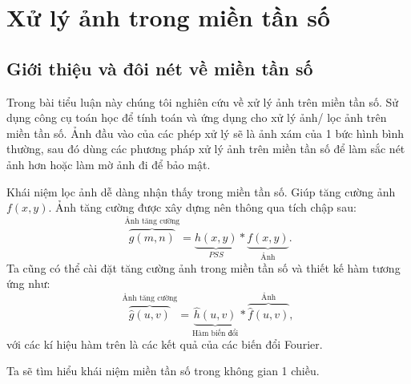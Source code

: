 \documentclass[12pt,a4paper]{report}
\numberwithin{equation}{section}
\theoremstyle{definition} %
\begin{document}
\chapter{\centering Xử lý ảnh trong miền tần số}

\section{Giới thiệu và đôi nét về miền tần số}
Trong bài tiểu luận này chúng tôi nghiên cứu về xử lý ảnh trên miền tần số. Sử dụng công cụ toán học để tính toán và ứng dụng cho xử lý ảnh/ lọc ảnh trên miền tần số. Ảnh đầu vào của các phép xử lý sẽ là ảnh xám của 1 bức hình bình thường, sau đó dùng các phương pháp xử lý ảnh trên miền tần số để làm sắc nét ảnh hơn hoặc làm mờ ảnh đi để 
bảo mật. 

Khái niệm lọc ảnh dễ dàng nhận thấy trong miền tần số. Giúp tăng cường ảnh $f(x,y)$. Ảnh tăng cường được xây dựng nên thông qua tích chập sau: 
\[\overbrace{g(m,n)}^{\text{Ảnh tăng cường}} = \underbrace{h(x,y)}_{PSS}\ast\underbrace{f(x,y)}_{\text{Ảnh}}.\]
Ta cũng có thể cài đặt tăng cường ảnh trong miền tần số và thiết kế hàm tương ứng như: 
\[\overbrace{\hat{g}(u,v)}^{\text{Ảnh tăng cường}} = \underbrace{\hat{h}(u,v)}_{\text{Hàm biến đổi}} \ast \overbrace{\hat{f}(u,v)}^{\text{Ảnh}},\]
với các kí hiệu hàm trên là các kết quả của các biến đổi Fourier.

Ta sẽ tìm hiểu khái niệm miền tần số trong không gian 1 chiều.
\end{document}
